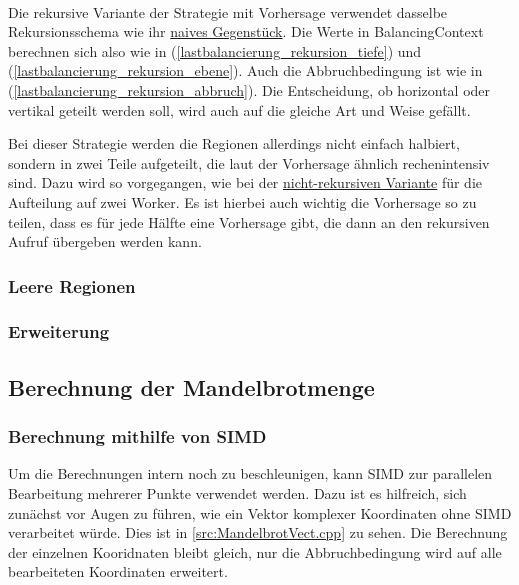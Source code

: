 \paragraph*{}
Die rekursive Variante der Strategie mit Vorhersage verwendet dasselbe Rekursionsschema wie ihr \hyperref[lastbalancierung_naiv_rekursion]{naives Gegenstück}.
Die Werte in BalancingContext berechnen sich also wie in (\ref{lastbalancierung_rekursion_tiefe}) und (\ref{lastbalancierung_rekursion_ebene}).
Auch die Abbruchbedingung ist wie in (\ref{lastbalancierung_rekursion_abbruch}). Die Entscheidung, ob horizontal oder vertikal geteilt werden soll, wird auch auf die gleiche Art und Weise gefällt.

Bei dieser Strategie werden die Regionen allerdings nicht einfach halbiert, sondern in zwei Teile aufgeteilt, die laut der Vorhersage ähnlich rechenintensiv sind.
Dazu wird so vorgegangen, wie bei der \hyperref[lastbalancierung_vorhersage]{nicht-rekursiven Variante} für die Aufteilung auf zwei Worker.
Es ist hierbei auch wichtig die Vorhersage so zu teilen, dass es für jede Hälfte eine Vorhersage gibt, die dann an den rekursiven Aufruf übergeben werden kann.

\subsubsection{Leere Regionen} \label{lastbalancierung_leereregion}

\subsubsection{Erweiterung} \label{lastbalancierung_erweiterung}

\subsection{Berechnung der Mandelbrotmenge}

\subsubsection{Berechnung mithilfe von SIMD}

Um die Berechnungen intern noch zu beschleunigen, kann SIMD zur parallelen Bearbeitung mehrerer Punkte verwendet werden.
Dazu ist es hilfreich, sich zunächst vor Augen zu führen, wie ein Vektor komplexer Koordinaten ohne SIMD verarbeitet würde.
Dies ist in \autoref{src:MandelbrotVect.cpp} zu sehen.
Die Berechnung der einzelnen Kooridnaten bleibt gleich, nur die Abbruchbedingung wird auf alle bearbeiteten Koordinaten erweitert.

